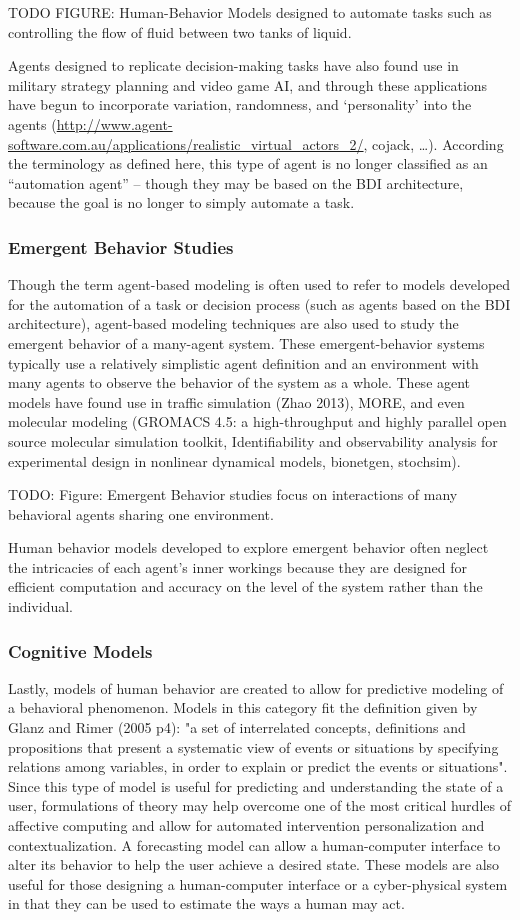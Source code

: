 TODO FIGURE: Human-Behavior Models designed to automate tasks such as controlling the flow of fluid between two tanks of liquid.

Agents designed to replicate decision-making tasks have also found use in military strategy planning and video game AI, and through these applications have begun to incorporate variation, randomness, and ‘personality’ into the agents (\url{http://www.agent-software.com.au/applications/realistic_virtual_actors_2/}, cojack, …). 
According the terminology as defined here, this type of agent is no longer classified as an “automation agent” -- though they may be based on the BDI architecture, because the goal is no longer to simply automate a task.

\subsubsection{Emergent Behavior Studies}
Though the term agent-based modeling is often used to refer to models developed for the automation of a task or decision process (such as agents based on the BDI architecture), agent-based modeling techniques are also used to study the emergent behavior of a many-agent system. 
These emergent-behavior systems typically use a relatively simplistic agent definition and an environment with many agents to observe the behavior of the system as a whole. 
These agent models have found use in traffic simulation (Zhao 2013), MORE, and even molecular modeling (GROMACS 4.5: a high-throughput and highly parallel open source molecular simulation toolkit, Identifiability and observability analysis for experimental design in nonlinear dynamical models, bionetgen, stochsim).

TODO: Figure: Emergent Behavior studies focus on interactions of many behavioral agents sharing one environment.

Human behavior models developed to explore emergent behavior often neglect the intricacies of each agent’s inner workings because they are designed for efficient computation and accuracy on the level of the system rather than the individual. 

\subsubsection{Cognitive Models}
Lastly, models of human behavior are created to allow for predictive modeling of a behavioral phenomenon.
Models in this category fit the definition given by Glanz and Rimer (2005 p4): "a set of interrelated concepts, definitions and propositions that present a systematic view of events or situations by specifying relations among variables, in order to explain or predict the events or situations".
Since this type of model is useful for predicting and understanding the state of a user, formulations of theory may help overcome one of the most critical hurdles of affective computing and allow for automated intervention personalization and contextualization. 
A forecasting model can allow a human-computer interface to alter its behavior to help the user achieve a desired state. 
These models are also useful for those designing a human-computer interface or a cyber-physical system in that they can be used to estimate the ways a human may act. 

